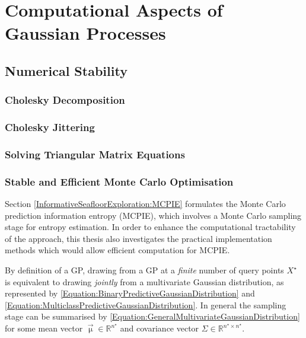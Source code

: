 \chapter{Computational Aspects of Gaussian Processes}
\label{Appendix:ComputationalAspects}

	\section{Numerical Stability}
	\label{Appendix:ComputationalAspects:NumericalStability}
	
		\subsection{Cholesky Decomposition}
		\label{Appendix:ComputationalAspects:NumericalStability:Cholesky}

		\subsection{Cholesky Jittering}
		\label{Appendix:ComputationalAspects:NumericalStability:CholeskyJittering}
				
		\subsection{Solving Triangular Matrix Equations}
		\label{Appendix:ComputationalAspects:NumericalStability:SolvingTriangularMatrices}
		
		\subsection{Stable and Efficient Monte Carlo Optimisation}
		\label{Appendix:ComputationalAspects:NumericalStability:MonteCarlo}
		
			Section \ref{InformativeSeafloorExploration:MCPIE} formulates the Monte Carlo prediction information entropy (MCPIE), which involves a Monte Carlo sampling stage for entropy estimation. In order to enhance the computational tractability of the approach, this thesis also investigates the practical implementation methods which would allow efficient computation for MCPIE.
			
			By definition of a GP, drawing from a GP at a \textit{finite} number of query points $X^{\star}$ is equivalent to drawing \textit{jointly} from a multivariate Gaussian distribution, as represented by \eqref{Equation:BinaryPredictiveGaussianDistribution} and \eqref{Equation:MulticlassPredictiveGaussianDistribution}. In general the sampling stage can be summarised by \eqref{Equation:GeneralMultivariateGaussianDistribution} for some mean vector $\vec{\upmu} \in \mathbb{R}^{n^{\star}}$ and covariance vector $\Sigma \in \mathbb{R}^{n^{\star} \times n^{\star}}$. 
			
